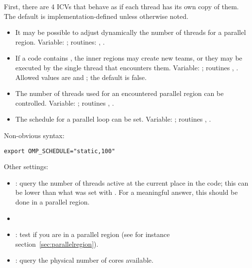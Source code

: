 First, there are 4 \acp{ICV} that behave as if each thread has its own copy of them.
The default is implementation-defined unless otherwise noted.
\begin{itemize}
  \item It may be possible to adjust dynamically the number of threads
    for a parallel region. Variable: ;
    routines: ,
    .
  \item If a code contains ,
    the inner regions may create new teams, or they may be executed by
    the single thread that encounters them. Variable:
    ; routines ,
    . Allowed values are  and
    ; the default is false.
  \item The number of threads used for an encountered parallel region
    can be controlled. Variable: ;
    routines ,
    .
  \item The schedule for a parallel loop can be set. Variable:
    ; routines
    , .
\end{itemize}

Non-obvious syntax:
\begin{verbatim}
export OMP_SCHEDULE="static,100"
\end{verbatim}

Other settings:
\begin{itemize}
\item{}: query the number of threads
  active at the current place in the code; this can be lower than what
  was set with . For a meaningful answer, this
  should be done in a parallel region.
\item{}
\item{}: test if you are in a parallel
  region (see for instance section~\ref{sec:parallelregion}).
\item{}: query the physical number of cores available.
\end{itemize}

